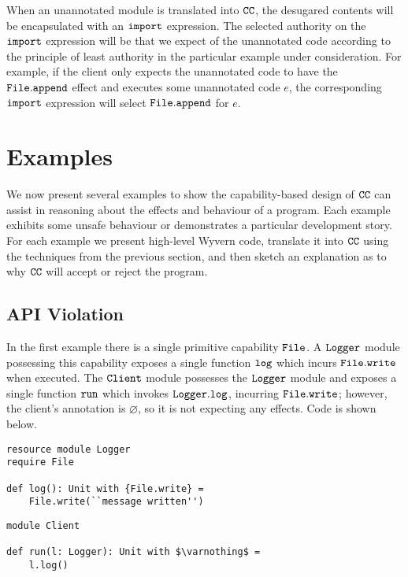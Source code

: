 When an unannotated module is translated into $\mathtt{CC}$, the desugared contents will be encapsulated with an $\mathtt{import}$ expression. The selected authority on the $\mathtt{import}$ expression will be that we expect of the unannotated code according to the principle of least authority in the particular example under consideration. For example, if the client only expects the unannotated code to have the $\mathtt{File.append}$ effect and executes some unannotated code $e$, the corresponding $\mathtt{import}$ expression will select $\mathtt{File.append}$ for $e$.

\section{Examples}

We now present several examples to show the capability-based design of $\mathtt{CC}$ can assist in reasoning about the effects and behaviour of a program. Each example exhibits some unsafe behaviour or demonstrates a particular development story. For each example we present high-level Wyvern code, translate it into $\mathtt{CC}$ using the techniques from the previous section, and then sketch an explanation as to why $\mathtt{CC}$ will accept or reject the program.

\subsection{API Violation}

In the first example there is a single primitive capability $\mathtt{File}$. A $\mathtt{Logger}$ module possessing this capability exposes a single function $\mathtt{log}$ which incurs $\mathtt{File.write}$ when executed. The $\mathtt{Client}$ module possesses the $\mathtt{Logger}$ module and exposes a single function $\mathtt{run}$ which invokes $\mathtt{Logger.log}$, incurring $\mathtt{File.write}$; however, the client's annotation is $\varnothing$, so it is not expecting any effects. Code is shown below.

\begin{lstlisting}
resource module Logger
require File

def log(): Unit with {File.write} =
    File.write(``message written'')
\end{lstlisting}

\begin{lstlisting}
module Client

def run(l: Logger): Unit with $\varnothing$ =
    l.log()
\end{lstlisting}

